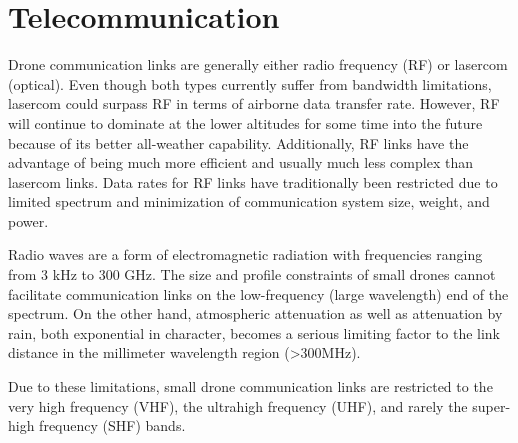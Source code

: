 \chapter{Telecommunication}\label{ch:tele}

Drone communication links are generally either radio frequency (RF) or lasercom (optical). Even though both types currently suffer from bandwidth limitations, lasercom could surpass RF in terms of airborne data transfer rate. However, RF will continue to dominate at the lower altitudes for some time into the future because of its better all-weather capability. Additionally, RF links have the advantage of being much more efficient and usually much less complex than lasercom links.
Data rates for RF links have traditionally been restricted due to limited spectrum and
minimization of communication system size, weight, and power.

Radio waves are a form of electromagnetic radiation with frequencies ranging from 3 kHz to 300 GHz. The size and profile constraints of small drones cannot facilitate communication links on the low-frequency (large wavelength) end of the spectrum. 
On the other hand, atmospheric attenuation as well as attenuation by rain, both
exponential in character, becomes a serious limiting factor to the link distance in
the millimeter wavelength region (>300MHz). 
	
Due to these limitations, small drone communication links are restricted to the very high frequency (VHF), the ultrahigh frequency (UHF), and rarely the super-high frequency (SHF) bands.

